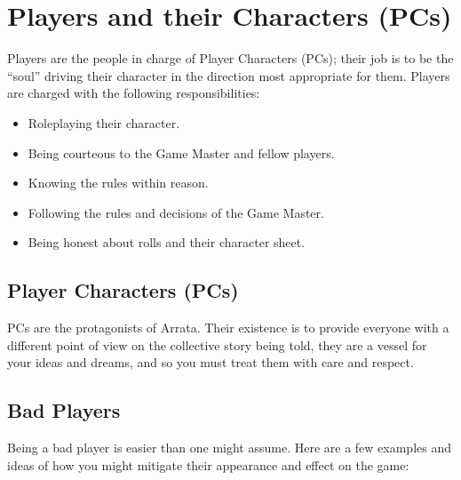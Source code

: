 \documentclass[../main.tex]{subfiles}
\begin{document}
    \section{Players and their Characters (PCs)}

    Players are the people in charge of Player Characters (PCs); their job is to be the ``soul'' driving their character in the direction most appropriate for them. Players are charged with the following responsibilities:

    \begin{itemize}
        \item Roleplaying their character.
        \item Being courteous to the Game Master and fellow players.
        \item Knowing the rules within reason.
        \item Following the rules and decisions of the Game Master.
        \item Being honest about rolls and their character sheet.
    \end{itemize}

    \subsection{Player Characters (PCs)}

    PCs are the protagonists of Arrata. Their existence is to provide everyone with a different point of view on the collective story being told, they are a vessel for your ideas and dreams, and so you must treat them with care and respect. 

    \subsection{Bad Players}

    Being a bad player is easier than one might assume. Here are a few examples and ideas of how you might mitigate their appearance and effect on the game:
    
\end{document}
